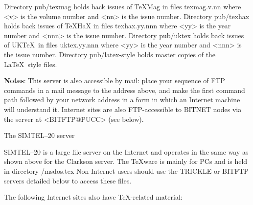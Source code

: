      Directory {\tx pub/texmag} holds back issues of \TeX Mag in files
     {\tx texmag.v.nn} where <{\tx v}> is the volume number and
     <{\tx nn}> is the issue number. \nl
     Directory {\tx pub/texhax} holds back issues of \TeX HaX in files
     {\tx texhax.yy.nnn} where <{\tx yy}> is the year number and
     <{\tx nnn}> is the issue number. \nl
     Directory {\tx pub/uktex} holds back issues of UK\TeX\ in files
     {\tx uktex.yy.nnn} where <{\tx yy}> is the year number and
     <{\tx nnn}> is the issue number. \nl
     Directory {\tx pub/latex-style} holds master copies of the \LaTeX\
     style files.

{\bf Notes}:  This server is also accessible by mail: place your
     sequence of FTP commands in a mail message to the address above,
     and make the first command {\tx path} followed by your network
     address in a form in which an Internet machine will understand it.
     Internet sites are also FTP-accessible to BITNET nodes via the
     server at <{\tx BITFTP@PUCC}> (see below).

 {The SIMTEL--20 server}

     SIMTEL--20 is a large file server on the Internet and operates in
     the same way as shown above for the Clarkson server. The \TeX ware
     is mainly for PCs and is held in directory {\tx /msdos.tex}\nl
     Non-Internet users should use the TRICKLE or BITFTP servers
     detailed below to access these files.

     The following Internet sites also have \TeX-related material:

